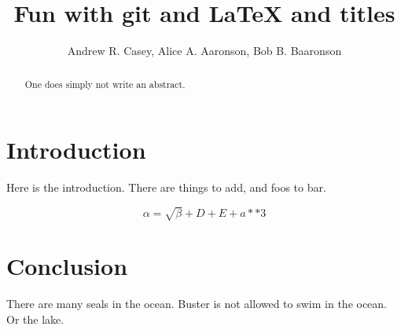 \documentclass{article}
\begin{document}
\title{Fun with git and \LaTeX{ and titles}}
\author{Andrew R. Casey, Alice A. Aaronson, Bob B. Baaronson}

\maketitle

\begin{abstract}
One does simply not write an abstract.
\end{abstract}

\section{Introduction}
Here is the introduction. There are things to add, and foos to bar.

\begin{equation}
    \label{simple_equation}
    \alpha = \sqrt{ \beta } + D + E + a**3
\end{equation}


\section{Conclusion}
There are many seals in the ocean. Buster is not allowed to swim in the ocean. Or the lake.
\end{document}

